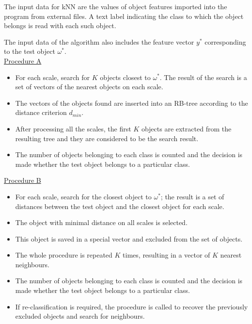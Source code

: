 \documentclass[entropy,article,submit,moreauthors,pdftex]{Definitions/mdpi}
\begin{document}
\begin{paracol}{2}
The input data for kNN are the values of object features imported into the program from external files. A text label indicating the class to which the object belongs is read with each such object.

The input data of the algorithm also includes the feature vector $y^*$ corresponding to the test object $\omega^*$.\\

\underline{Procedure A}

\begin{itemize}
\item For each scale, search for $K$ objects closest to $\omega^*$. The result of the search is a set of vectors of  the nearest objects on each scale.
\item The vectors of the objects found are inserted into an RB-tree according to the distance criterion $d_{min}$.
\item After processing all the scales, the first $K$ objects are extracted from the resulting tree and they are considered to be the search result.
\item The number of objects belonging to each class is counted and the decision is made whether   the test object belongs to a particular class.
\end{itemize}

\underline{Procedure B}

\begin{itemize}
\item For each scale, search for the closest object to $\omega^*$; the result is a set of distances between the test object and the closest object for each scale.
\item The object with minimal distance on all scales is selected.
\item This object is saved in a special vector and excluded from the set of objects.
\item The whole procedure is repeated $K$ times, resulting in a vector of $K$ nearest neighbours.
\item The number of objects belonging to each class is counted and the decision is made whether   the test object belongs to a particular class.
\item If re-classification is required, the procedure is called to recover the previously excluded objects and search for neighbours.
\end{itemize}



\end{paracol}
\end{document}
